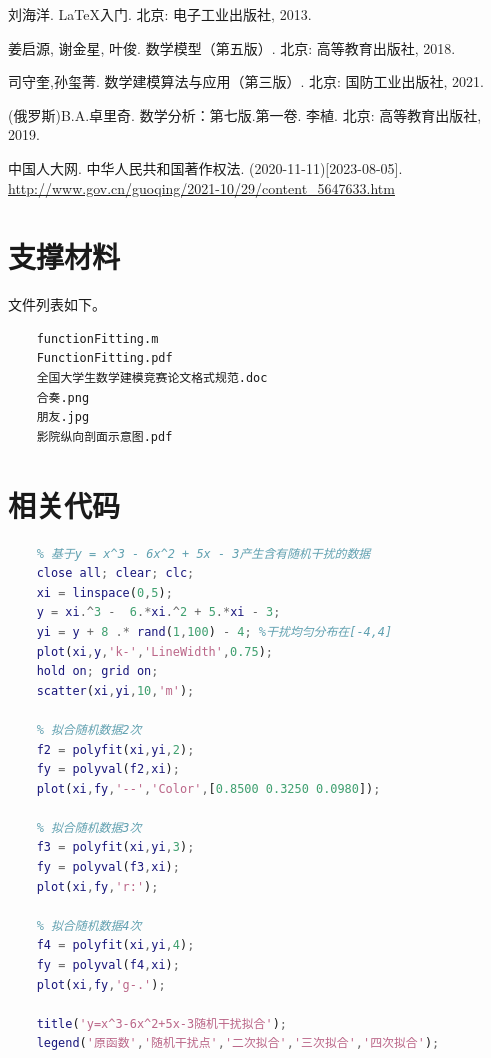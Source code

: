 \documentclass[nogbt]{my_cumcmthesis}
\begin{document}
\begin{thebibliography}{9}
    刘海洋.
    \newblock \LaTeX {}入门\allowbreak[M].
    \newblock 北京: 电子工业出版社, 2013.

    姜启源, 谢金星, 叶俊.
    \newblock 数学模型（第五版）\allowbreak[M].
    \newblock 北京: 高等教育出版社, 2018.

    司守奎,孙玺菁.
    \newblock 数学建模算法与应用（第三版）\allowbreak[M].
    \newblock 北京: 国防工业出版社, 2021.

    (俄罗斯)B.A.卓里奇.
    \newblock 数学分析：第七版.第一卷\allowbreak[M].
    \newblock 李植. 北京: 高等教育出版社, 2019.

    中国人大网.
    \newblock 中华人民共和国著作权法\allowbreak[EB/OL].
    \newblock (2020-11-11)[2023-08-05].
    \newblock \url{http://www.gov.cn/guoqing/2021-10/29/content_5647633.htm}
\end{thebibliography}
\newpage

\begin{appendix}
\section{支撑材料}
    文件列表如下。
\begin{lstlisting}
    functionFitting.m
    FunctionFitting.pdf
    全国大学生数学建模竞赛论文格式规范.doc
    合奏.png
    朋友.jpg
    影院纵向剖面示意图.pdf
\end{lstlisting}

\section{相关代码}
\begin{lstlisting}[language=matlab]
    % functionFitting.m
    % 基于y = x^3 - 6x^2 + 5x - 3产生含有随机干扰的数据
    close all; clear; clc;
    xi = linspace(0,5);
    y = xi.^3 -  6.*xi.^2 + 5.*xi - 3;
    yi = y + 8 .* rand(1,100) - 4; %干扰均匀分布在[-4,4]
    plot(xi,y,'k-','LineWidth',0.75);
    hold on; grid on;
    scatter(xi,yi,10,'m');
    
    % 拟合随机数据2次
    f2 = polyfit(xi,yi,2);
    fy = polyval(f2,xi);
    plot(xi,fy,'--','Color',[0.8500 0.3250 0.0980]);
    
    % 拟合随机数据3次
    f3 = polyfit(xi,yi,3);
    fy = polyval(f3,xi);
    plot(xi,fy,'r:');
    
    % 拟合随机数据4次
    f4 = polyfit(xi,yi,4);
    fy = polyval(f4,xi);
    plot(xi,fy,'g-.');
    
    title('y=x^3-6x^2+5x-3随机干扰拟合');
    legend('原函数','随机干扰点','二次拟合','三次拟合','四次拟合');
\end{lstlisting}
\end{appendix}
\end{document}
